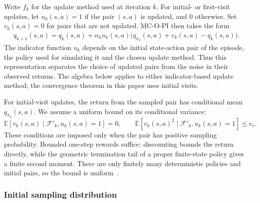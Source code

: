 \documentclass[twoside,11pt]{article}
\DeclareRobustCommand{\reviewbarstart}{%
  \ifhmode %
    \vadjust{\vbox to 0pt{%
      \vskip-\ht\strutbox %
      \vskip-\dp\strutbox %
      \cbstart[\changebarwidth] %
      \vss %
    }}%
  \else %
    \cbstart[\changebarwidth]%
  \fi %
} %
\providecommand{\DIFadd}[1]{#1} %
\providecommand{\DIFaddbegin}{\reviewbarstart} %
\providecommand{\DIFaddend}{\protect\cbend} %
\def\DIFadd#1{#1}%
\def\DIFaddbegin{}%
\def\DIFaddend{}%
\begin{document}
 \DIFaddbegin \DIFadd{Write $f_k$ for the update method used at iteration $k$.
For }\DIFaddend initial-  or first-visit  updates,  \DIFaddbegin \DIFadd{let }\DIFaddend $u_k(s,a)=1$ if  \DIFaddbegin \DIFadd{the pair $(s,a)$ is }\DIFaddend updated, and  \DIFaddbegin \DIFadd{$0$ otherwise. Set $v_k(s,a)=0$ for pairs that are not updated.
MC-O-PI then takes the form
}\begin{align}
\DIFadd{\label{eq: update q with chi}
q_{k+1}(s,a)
= q_k(s,a)+\alpha_k u_k(s,a)\big(q_{\pi_k}(s,a)+v_k(s,a)-q_k(s,a)\big).
}\end{align}
\DIFaddend The indicator function $u_k$ depends on the initial state-action pair of the  episode, the policy used for simulating it and the chosen update  \DIFaddbegin \DIFadd{method.
Thus this representation separates the choice of updated pairs from the noise in their observed returns. The algebra below applies to either indicator-based update method; the convergence theorem in this paper uses initial visits.
}

\DIFadd{For initial-visit updates, the return from the sampled pair has conditional mean $q_{\pi_k}(s,a)$. We assume a uniform bound on its conditional variance:
}\begin{equation}
\DIFadd{\label{eq: return moments}
\mathbb E}[\DIFadd{v_k(s,a)\mid\mathcal F'_k,u_k(s,a)=1}]\DIFadd{=0,
\qquad
\mathbb E}[\DIFadd{v_k(s,a)^2\mid\mathcal F'_k,u_k(s,a)=1}]\DIFadd{\le c_v.
}\end{equation}
\DIFadd{These conditions are imposed only when the pair has positive sampling probability. Bounded one-step rewards suffice: discounting bounds the return directly, while the geometric termination tail of a proper finite-state policy gives a finite second moment. There are only finitely many deterministic policies and initial pairs, so the bound is uniform~\citep[Section~2.2.1]{Bertsekas1996Neuro-DynamicProgramming}}\DIFaddend .

\subsubsection{Initial sampling distribution}
\end{document}
